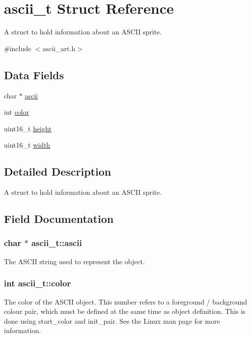\hypertarget{structascii__t}{}\section{ascii\+\_\+t Struct Reference}
\label{structascii__t}


A struct to hold information about an A\+S\+C\+II sprite.  




{\ttfamily \#include $<$ascii\+\_\+art.\+h$>$}

\subsection*{Data Fields}
\begin{DoxyCompactItemize}
\item 
char $\ast$ \hyperlink{structascii__t_a78fc115bb20d9af8ba8f640200027e22}{ascii}
\item 
int \hyperlink{structascii__t_a9a0d8716acbfc50587bb8e72e97b1b39}{color}
\item 
uint16\+\_\+t \hyperlink{structascii__t_ab60ac2dac5effbff37ae096f0898ac54}{height}
\item 
uint16\+\_\+t \hyperlink{structascii__t_af246687087b404068b50c0fad93b2320}{width}
\end{DoxyCompactItemize}


\subsection{Detailed Description}
A struct to hold information about an A\+S\+C\+II sprite. 

\subsection{Field Documentation}
\subsubsection[{\texorpdfstring{ascii}{ascii}}]{\setlength{\rightskip}{0pt plus 5cm}char $\ast$ ascii\+\_\+t\+::ascii}\hypertarget{structascii__t_a78fc115bb20d9af8ba8f640200027e22}{}\label{structascii__t_a78fc115bb20d9af8ba8f640200027e22}
The A\+S\+C\+II string used to represent the object. 
\subsubsection[{\texorpdfstring{color}{color}}]{\setlength{\rightskip}{0pt plus 5cm}int ascii\+\_\+t\+::color}\hypertarget{structascii__t_a9a0d8716acbfc50587bb8e72e97b1b39}{}\label{structascii__t_a9a0d8716acbfc50587bb8e72e97b1b39}
The color of the A\+S\+C\+II object. This number refers to a foreground / background colour pair, which must be defined at the same time as object definition. This is done using start\+\_\+color and init\+\_\+pair. See the Linux man page for more information. 
